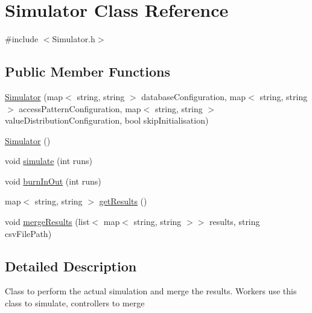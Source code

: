 \hypertarget{classSimulator}{
\section{Simulator Class Reference}
\label{classSimulator}
}


{\ttfamily \#include $<$Simulator.h$>$}\subsection*{Public Member Functions}
\begin{DoxyCompactItemize}
\item 
\hyperlink{classSimulator_a5c46ca7ea1fd4a67fc43d931fadbb347}{Simulator} (map$<$ string, string $>$ databaseConfiguration, map$<$ string, string $>$ accessPatternConfiguration, map$<$ string, string $>$ valueDistributionConfiguration, bool skipInitialisation)
\item 
\hyperlink{classSimulator_a031573bfcfe2e0f5c9539bcc1c7fc5d9}{Simulator} ()
\item 
void \hyperlink{classSimulator_a833eb17dd0d0d1b0b1f7c0747032c21c}{simulate} (int runs)
\item 
void \hyperlink{classSimulator_a224de0acb821d6b4e333c1821bea57d9}{burnInOut} (int runs)
\item 
map$<$ string, string $>$ \hyperlink{classSimulator_a510b4c3d8d032e7b5abf12e2572a8c5b}{getResults} ()
\item 
void \hyperlink{classSimulator_a3c9f45bd002ee6b88b6ec4d55d65e0ff}{mergeResults} (list$<$ map$<$ string, string $>$$>$ results, string csvFilePath)
\end{DoxyCompactItemize}


\subsection{Detailed Description}
Class to perform the actual simulation and merge the results. Workers use this class to simulate, controllers to merge 

